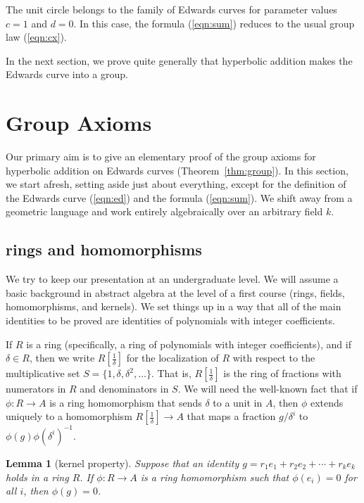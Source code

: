 \documentclass[12pt]{article}
\newtheorem{lemma}[theorem]{Lemma}
\newcommand{\f}[1]{\frac{1}{#1}}
\begin{document}
The unit circle belongs to the family of Edwards curves for parameter
values $c=1$ and $d=0$.  In this case, the formula (\ref{eqn:sum})
reduces to the usual group law (\ref{eqn:cx}).

In the next section, we prove quite generally that hyperbolic addition
makes the Edwards curve into a group.

\section{Group Axioms}\label{sec:axiom}

Our primary aim is to give an elementary proof of the group axioms for
hyperbolic addition on Edwards curves (Theorem~\ref{thm:group}).  In
this section, we start afresh, setting aside just about everything,
except for the definition of the Edwards curve (\ref{eqn:ed}) and
the formula (\ref{eqn:sum}).  We shift away from
a geometric language and work entirely algebraically over an arbitrary
field $k$.

\subsection{rings and homomorphisms}

We try to keep our presentation at an undergraduate level.  We will
assume a basic background in abstract algebra at the level of a first
course (rings, fields, homomorphisms, and kernels).  We set things up
in a way that all of the main identities to be proved are identities
of polynomials with integer coefficients.

If $R$ is a ring (specifically, a ring of polynomials with integer
coefficients), and if $\delta\in R$, then we write $R[\f{\delta}]$ for
the localization of $R$ with respect to the multiplicative set
$S=\{1,\delta,\delta^2,\ldots\}$.  That is, $R[\f{\delta}]$ is the
ring of fractions with numerators in $R$ and denominators in $S$.  We
will need the well-known fact that if $\phi:R\to A$ is a ring
homomorphism that sends $\delta$ to a unit in $A$, then $\phi$ extends
uniquely to a homomorphism $R[\f{\delta}]\to A$ that maps a fraction
$g/\delta^i$ to $\phi(g)\phi(\delta^i)^{-1}$.

\begin{lemma}[kernel property] Suppose that an identity $g = r_1 e_1 +
  r_2 e_2 +\cdots + r_k e_k$ holds in a ring $R$.  If $\phi:R\to A$ is
  a ring homomorphism such that $\phi(e_i) =0$ for all $i$, then
  $\phi(g)=0$.
\end{lemma}
\end{document}
